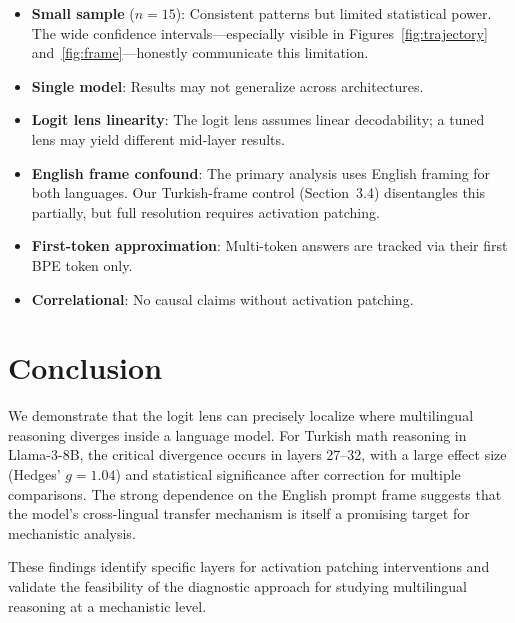 \documentclass[11pt,a4paper]{article}
\begin{document}
\begin{itemize}[nosep]
    \item \textbf{Small sample} ($n = 15$): Consistent patterns but limited statistical power. The wide confidence intervals---especially visible in Figures~\ref{fig:trajectory} and~\ref{fig:frame}---honestly communicate this limitation.
    \item \textbf{Single model}: Results may not generalize across architectures.
    \item \textbf{Logit lens linearity}: The logit lens assumes linear decodability; a tuned lens \citep{belrose2023tuned} may yield different mid-layer results.
    \item \textbf{English frame confound}: The primary analysis uses English framing for both languages. Our Turkish-frame control (Section~3.4) disentangles this partially, but full resolution requires activation patching.
    \item \textbf{First-token approximation}: Multi-token answers are tracked via their first BPE token only.
    \item \textbf{Correlational}: No causal claims without activation patching.
\end{itemize}

\section{Conclusion}

We demonstrate that the logit lens can precisely localize where multilingual reasoning diverges inside a language model.
For Turkish math reasoning in Llama-3-8B, the critical divergence occurs in layers 27--32, with a large effect size (Hedges' $g = 1.04$) and statistical significance after correction for multiple comparisons.
The strong dependence on the English prompt frame suggests that the model's cross-lingual transfer mechanism is itself a promising target for mechanistic analysis.

These findings identify specific layers for activation patching interventions and validate the feasibility of the diagnostic approach for studying multilingual reasoning at a mechanistic level.


\end{document}
